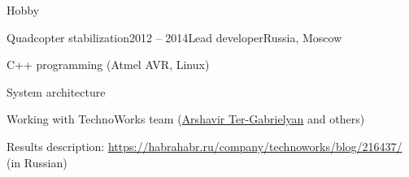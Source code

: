\documentclass{resume} %
\begin{document}
\begin{rSection}{Hobby}
\begin{rSubsection}{Quadcopter stabilization}{2012 -- 2014}{Lead developer}{Russia, Moscow}
\item C++ programming (Atmel AVR, Linux)
\item System architecture
\item Working with TechnoWorks team (\href{http://www.pm.inf.ethz.ch/people/person-detail.html?persid=220074}{Arshavir Ter-Gabrielyan} and others)
\item Results description: \url{https://habrahabr.ru/company/technoworks/blog/216437/} (in Russian)
\end{rSubsection}

\end{rSection}

\end{document}
